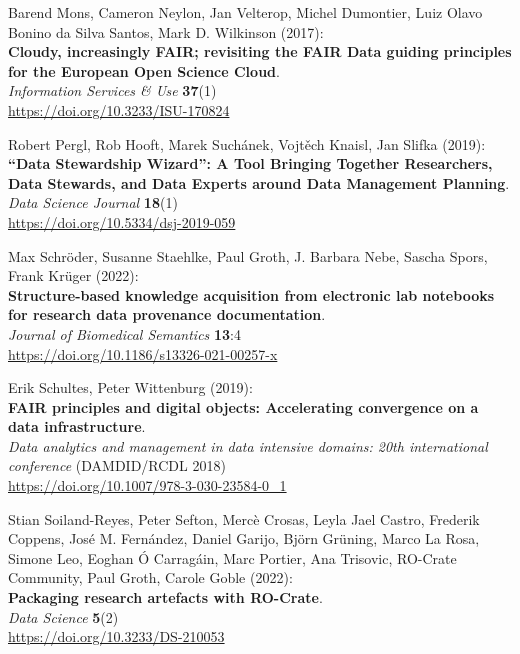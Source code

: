 \begin{thebibliography}{9}
 Barend Mons, Cameron Neylon, Jan Velterop, Michel
Dumontier, Luiz Olavo Bonino da Silva Santos, Mark D. Wilkinson
(2017):\\
\textbf{Cloudy, increasingly FAIR; revisiting the FAIR Data guiding
principles for the European Open Science Cloud}.\\
\emph{Information Services \& Use} \textbf{37}(1)\\
\url{https://doi.org/10.3233/ISU-170824}

 Robert Pergl, Rob Hooft, Marek Suchánek, Vojtěch
Knaisl, Jan Slifka (2019):\\
\textbf{``Data Stewardship Wizard'': A Tool Bringing Together
Researchers, Data Stewards, and Data Experts around Data Management
Planning}.\\
\emph{Data Science Journal} \textbf{18}(1)\\
\url{https://doi.org/10.5334/dsj-2019-059}

 Max Schröder, Susanne Staehlke, Paul Groth, J.
Barbara Nebe, Sascha Spors, Frank Krüger (2022):\\
\textbf{Structure-based knowledge acquisition from electronic lab
notebooks for research data provenance documentation}.\\
\emph{Journal of Biomedical Semantics} \textbf{13}:4\\
\url{https://doi.org/10.1186/s13326-021-00257-x}

 Erik Schultes, Peter Wittenburg (2019):\\
\textbf{FAIR principles and digital objects: Accelerating convergence on
a data infrastructure}.\\
\emph{Data analytics and management in data intensive domains: 20th
international conference} (DAMDID/RCDL 2018)\\
\url{https://doi.org/10.1007/978-3-030-23584-0_1}

 Stian Soiland-Reyes, Peter Sefton, Mercè
Crosas, Leyla Jael Castro, Frederik Coppens, José M. Fernández, Daniel
Garijo, Björn Grüning, Marco La Rosa, Simone Leo, Eoghan Ó Carragáin,
Marc Portier, Ana Trisovic, RO-Crate Community, Paul Groth, Carole Goble
(2022):\\
\textbf{Packaging research artefacts with RO-Crate}.\\
\emph{Data Science} \textbf{5}(2)\\
\url{https://doi.org/10.3233/DS-210053}


\end{thebibliography}
